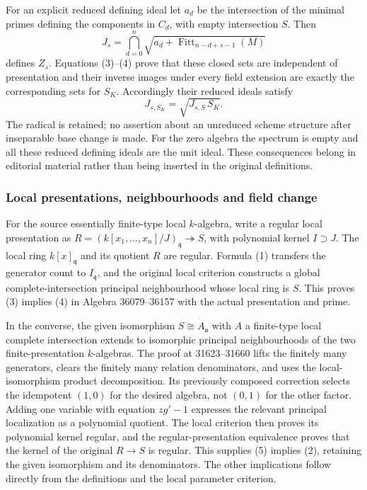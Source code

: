For an explicit reduced defining ideal let \(a_d\) be the intersection of the minimal primes defining the components in \(C_d\), with empty intersection \(S\). Then \[
J_s=\bigcap_{d=0}^{n}\sqrt{a_d+\operatorname{Fitt}_{n-d+s-1}(M)}
\] defines \(Z_s\). Equations (3)--(4) prove that these closed sets are independent of presentation and their inverse images under every field extension are exactly the corresponding sets for \(S_K\). Accordingly their reduced ideals satisfy \[
J_{s,S_K}=\sqrt{J_{s,S}\,S_K}.
\] The radical is retained; no assertion about an unreduced scheme structure after inseparable base change is made. For the zero algebra the spectrum is empty and all these reduced defining ideals are the unit ideal. These consequences belong in editorial material rather than being inserted in the original definitions.

\subsubsection{Local presentations, neighbourhoods and field change}\label{algebra-proof-045-local-presentations-neighbourhoods-and-field-change}

For the source essentially finite-type local \(k\)-algebra, write a regular local presentation as \(R=(k[x_1,\ldots,x_n]/J)_{\mathfrak q}\twoheadrightarrow S\), with polynomial kernel \(I\supset J\). The local ring \(k[x]_{\mathfrak q}\) and its quotient \(R\) are regular. Formula (1) transfers the generator count to \(I_{\mathfrak q}\), and the original local criterion constructs a global complete-intersection principal neighbourhood whose local ring is \(S\). This proves (3) implies (4) in Algebra 36079--36157 with the actual presentation and prime.

In the converse, the given isomorphism \(S\cong A_{\mathfrak a}\) with \(A\) a finite-type local complete intersection extends to isomorphic principal neighbourhoods of the two finite-presentation \(k\)-algebras. The proof at 31623--31660 lifts the finitely many generators, clears the finitely many relation denominators, and uses the local-isomorphism product decomposition. Its previously composed correction selects the idempotent \((1,0)\) for the desired algebra, not \((0,1)\) for the other factor. Adding one variable with equation \(zg'-1\) expresses the relevant principal localization as a polynomial quotient. The local criterion then proves its polynomial kernel regular, and the regular-presentation equivalence proves that the kernel of the original \(R\to S\) is regular. This supplies (5) implies (2), retaining the given isomorphism and its denominators. The other implications follow directly from the definitions and the local parameter criterion.

